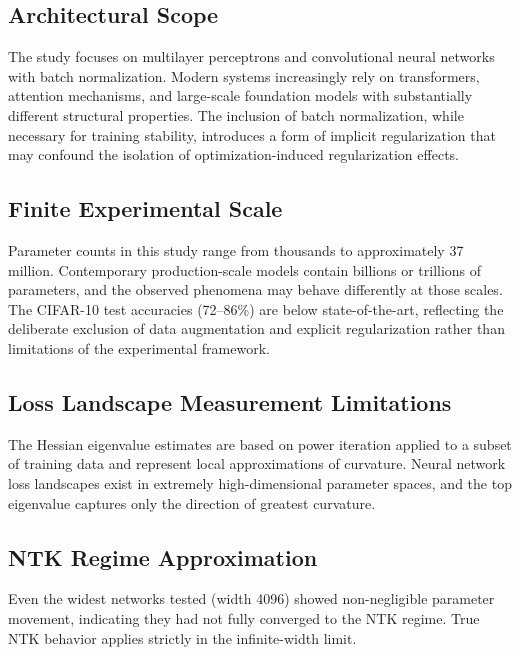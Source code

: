 \documentclass[conference]{IEEEtran}
\begin{document}
\subsection{Architectural Scope}

The study focuses on multilayer perceptrons and convolutional neural networks with batch normalization. Modern systems increasingly rely on transformers, attention mechanisms, and large-scale foundation models with substantially different structural properties. The inclusion of batch normalization, while necessary for training stability, introduces a form of implicit regularization that may confound the isolation of optimization-induced regularization effects.

\subsection{Finite Experimental Scale}

Parameter counts in this study range from thousands to approximately 37 million. Contemporary production-scale models contain billions or trillions of parameters, and the observed phenomena may behave differently at those scales. The CIFAR-10 test accuracies (72--86\%) are below state-of-the-art, reflecting the deliberate exclusion of data augmentation and explicit regularization rather than limitations of the experimental framework.

\subsection{Loss Landscape Measurement Limitations}

The Hessian eigenvalue estimates are based on power iteration applied to a subset of training data and represent local approximations of curvature. Neural network loss landscapes exist in extremely high-dimensional parameter spaces, and the top eigenvalue captures only the direction of greatest curvature.

\subsection{NTK Regime Approximation}

Even the widest networks tested (width 4096) showed non-negligible parameter movement, indicating they had not fully converged to the NTK regime. True NTK behavior applies strictly in the infinite-width limit.

\end{document}
